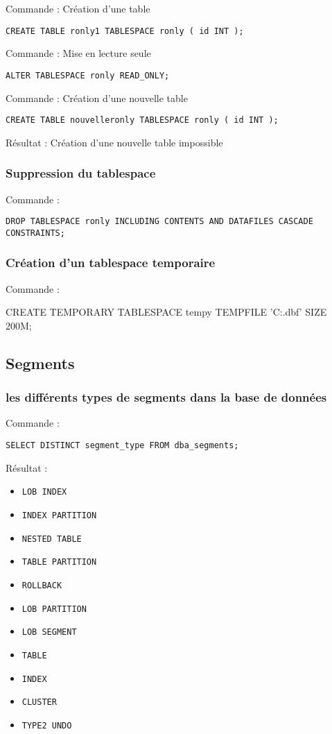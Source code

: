 Commande : Création d'une table
\begin{verbatim}
CREATE TABLE ronly1 TABLESPACE ronly ( id INT );
\end{verbatim}

Commande : Mise en lecture seule
\begin{verbatim}
ALTER TABLESPACE ronly READ_ONLY;
\end{verbatim}

Commande : Création d'une nouvelle table
\begin{verbatim}
CREATE TABLE nouvelleronly TABLESPACE ronly ( id INT );
\end{verbatim}

Résultat : Création d'une nouvelle table impossible

\subsubsection{Suppression du tablespace}

Commande :
\begin{verbatim}
DROP TABLESPACE ronly INCLUDING CONTENTS AND DATAFILES CASCADE CONSTRAINTS;
\end{verbatim}

\subsubsection{Création d'un tablespace temporaire}

Commande :
\begin{verbatimtab}
CREATE TEMPORARY TABLESPACE tempy
	TEMPFILE 'C:\app\isima\oradata\orcl\temp.dbf' SIZE 200M;
\end{verbatimtab}

\subsection{Segments}

\subsubsection{les différents types de segments dans la base de données}

Commande :
\begin{verbatim}
SELECT DISTINCT segment_type FROM dba_segments;
\end{verbatim}

Résultat :
\begin{itemize}
\item \verb|LOB INDEX|
\item \verb|INDEX PARTITION|
\item \verb|NESTED TABLE|
\item \verb|TABLE PARTITION|
\item \verb|ROLLBACK|
\item \verb|LOB PARTITION|
\item \verb|LOB SEGMENT|
\item \verb|TABLE|
\item \verb|INDEX|
\item \verb|CLUSTER|
\item \verb|TYPE2 UNDO|
\end{itemize}

